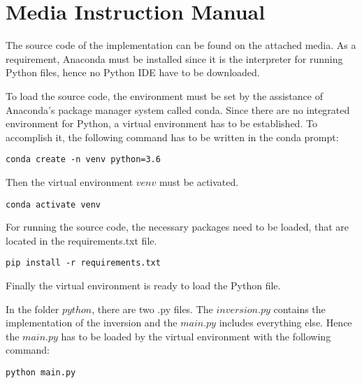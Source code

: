 \chapter*{Media Instruction Manual}

The source code of the implementation can be found on the attached media. As a requirement, Anaconda must be installed since it is the interpreter for running Python files, hence no Python IDE have to be downloaded. \smallskip

To load the source code, the environment must be set by the assistance of Anaconda's package manager system called conda. Since there are no integrated environment for Python, a virtual environment has to be established. To accomplish it, the following command has to be written in the conda prompt: 
\begin{lstlisting}
conda create -n venv python=3.6
\end{lstlisting}
Then the virtual environment $venv$ must be activated.
\begin{lstlisting}
conda activate venv
\end{lstlisting}
For running the source code, the necessary packages need to be loaded, that are located in the requirements.txt file.
\begin{lstlisting}
pip install -r requirements.txt
\end{lstlisting}
Finally the virtual environment is ready to load the Python file.\smallskip

In the folder $python$, there are two .py files. The $inversion.py$ contains the implementation of the inversion and the $main.py$ includes everything else. Hence the $main.py$ has to be loaded by the virtual environment with the following command: 
\begin{lstlisting}
python main.py
\end{lstlisting}
